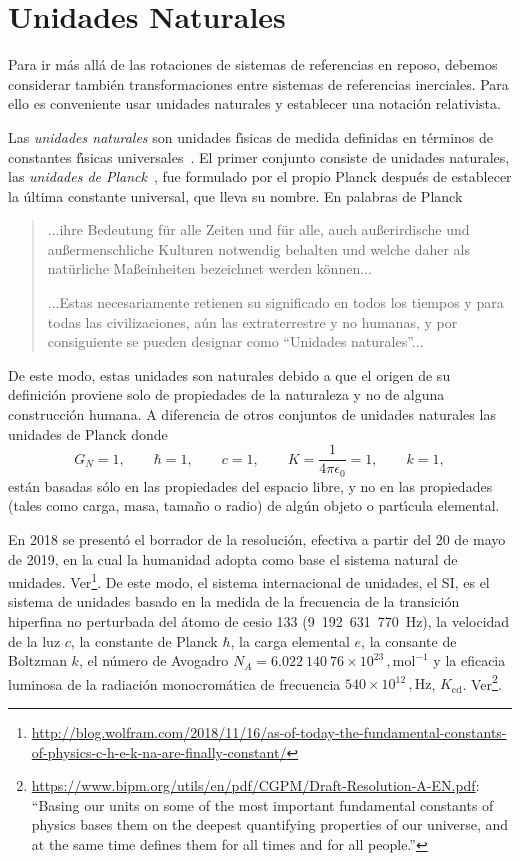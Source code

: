 \section{Unidades Naturales}
\label{sec:NU}
Para ir más allá de las rotaciones de sistemas de referencias en reposo, debemos considerar también transformaciones entre sistemas de referencias inerciales. Para ello es conveniente usar unidades naturales y establecer una notación relativista.


Las \emph{unidades naturales} son unidades f\'\i sicas de medida definidas en t\'erminos de constantes f\'\i sicas universales~\cite{NU}. El primer conjunto consiste de unidades naturales, las \emph{unidades de Planck}~\cite{PU},  fue formulado por el propio Planck despu\'es de establecer la \'ultima constante universal, que lleva su nombre.  En palabras de Planck
\begin{quotation} %

  ...ihre Bedeutung f\"ur alle Zeiten und f\"ur alle, auch au\ss erirdische und au\ss ermenschliche Kulturen notwendig behalten und welche daher als \guillemotright nat\"urliche Ma\ss einheiten bezeichnet werden k\"onnen... %

...Estas necesariamente retienen su significado en todos los tiempos y para todas las civilizaciones, aún las extraterrestre y no humanas, y por consiguiente se pueden designar como ``Unidades naturales''...
\end{quotation} %
De este modo, estas unidades son naturales debido a que el origen de su definici\'on proviene solo de propiedades de la naturaleza y no de alguna construcci\'on humana. A diferencia de otros conjuntos de unidades naturales las unidades de Planck donde
\begin{equation}
\label{eq:144}
  G_N=1,\qquad \hbar=1,\qquad c=1,\qquad K=\frac{1}{4\pi\epsilon_0}=1,\qquad k=1,
\end{equation}
est\'an basadas s\'olo en las propiedades del espacio libre, y no en las propiedades (tales como carga, masa, tama\~no o radio) de alg\'un objeto o part\'\i cula elemental. 

En 2018 se presentó el borrador de la resolución, efectiva a partir del 20 de mayo  de 2019, en la cual la humanidad adopta como base el sistema natural de unidades. Ver\footnote{\url{http://blog.wolfram.com/2018/11/16/as-of-today-the-fundamental-constants-of-physics-c-h-e-k-na-are-finally-constant/}}. De este modo, el sistema internacional  de unidades, el SI, es el sistema de unidades basado en la medida de la frecuencia de la transición hiperfina no perturbada del átomo de cesio 133 (9~192~631~770~Hz), la velocidad de la luz $c$, la constante de Planck $\hbar$, la carga elemental $e$, la consante de Boltzman $k$, el número de Avogadro $N_A=6.022~140~76\times 10^{23}\,,\text{mol}^{-1}$ y la eficacia luminosa de la radiación monocromática de frecuencia $540\times 10^{12}\,,\text{Hz}$, $K_{\text{cd}}$. Ver\footnote{\url{https://www.bipm.org/utils/en/pdf/CGPM/Draft-Resolution-A-EN.pdf}: ``Basing our units on some of the most important fundamental constants of physics bases them on the deepest quantifying properties of our universe, and at the same time defines them for all times and for all people.''}.

